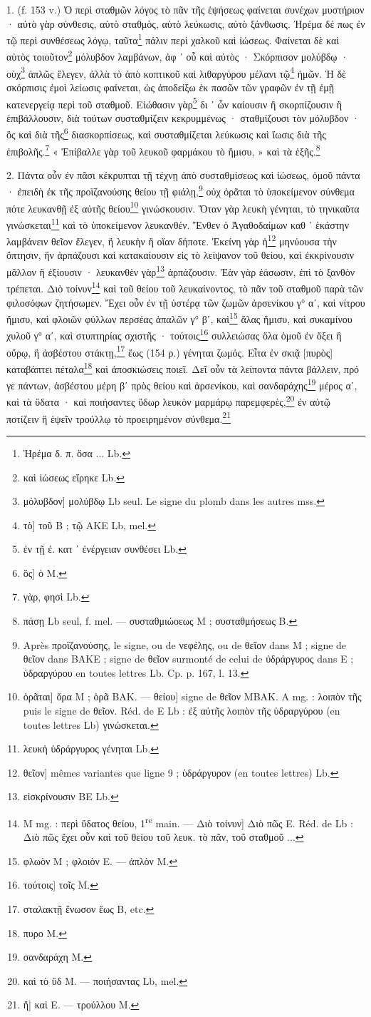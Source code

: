 \documentclass[a4paper, 11pt, oneside, polutonikogreek, french]{article}
\begin{document}
1. (f. 153 v.) Ὁ περὶ σταθμῶν λόγος τὸ πᾶν τῆς ἑψήσεως φαίνεται συνέχων μυστήριον · αὐτὸ γὰρ σύνθεσις, αὐτὸ σταθμὸς, αὐτὸ λεύκωσις, αὐτὸ ξάνθωσις. Ἠρέμα δέ πως ἐν τῷ περὶ συνθέσεως λόγῳ, ταῦτα\footnote{Ἠρέμα δ. π. ὅσα ... Lb.} πάλιν περὶ χαλκοῦ καὶ ἰώσεως. Φαίνεται δὲ καὶ αὐτὸς τοιοῦτον\footnote{καὶ ἰώσεως εἴρηκε Lb.} μόλυβδον λαμβάνων, ἀφ ᾽ οὗ καὶ αὐτὸς · Σκόρπισον μολύβδῳ · οὐχ\footnote{μόλυβδον] μολύβδῳ Lb seul. Le signe du plomb dans les autres mss.} ἁπλῶς ἔλεγεν, ἀλλὰ τὸ ἀπὸ κοπτικοῦ καὶ λιθαργύρου μέλανι τῷ\footnote{τὸ] τοῦ B ; τῷ AKE Lb, mel.} ἡμῶν. Ἡ δὲ σκόρπισις ἐμοὶ λείωσις φαίνεται, ὡς ἀποδείξω ἐκ πασῶν τῶν γραφῶν ἐν τῇ ἐμῇ κατενεργείᾳ περὶ τοῦ σταθμοῦ. Εἰώθασιν γὰρ\footnote{ἐν τῇ ἐ. κατ ᾽ ἐνέργειαν συνθέσει Lb.} δι ᾽ ὧν καίουσιν ἢ σκορπίζουσιν ἢ ἐπιβάλλουσιν, διὰ τούτων συσταθμίζειν κεκρυμμένως · σταθμίζουσι τὸν μόλυβδον · ὃς καὶ διὰ τῆς\footnote{ὃς] ὁ M.} διασκορπίσεως, καὶ συσταθμίζεται λεύκωσις καὶ ἴωσις διὰ τῆς ἐπιβολῆς.\footnote{γὰρ, φησὶ Lb.} « Ἐπίβαλλε γὰρ τοῦ λευκοῦ φαρμάκου τὸ ἥμισυ, » καὶ τὰ ἑξῆς.\footnote{πάσῃ Lb seul, f. mel. --- συσταθμιώοεως M ; συσταθμήσεως B.}

2. Πάντα οὖν ἐν πᾶσι κέκρυπται τῇ τέχνῃ ἀπὸ συσταθμίσεως καὶ ἰώσεως, ὁμοῦ πάντα · ἐπειδὴ ἐκ τῆς προϊζανούσης θείου τῇ φιάλῃ,\footnote{Après προϊζανούσης, le signe, ou de νεφέλης, ou de θεῖον dans M ; signe de θεῖον dans BAKE ; signe de θεῖον surmonté de celui de ὑδράργυρος dans E ; ὑδραργύρου en toutes lettres Lb. Cp. p. 167, l. 13.} οὐχ ὁρᾶται τὸ ὑποκείμενον σύνθεμα πότε λευκανθῇ ἐξ αὐτῆς θείου\footnote{ὁρᾶται] ὅρα M ; ὁρᾶ BAK. --- θείου] signe de θεῖον MBAK. A mg. : λοιπὸν τῆς puis le signe de θεῖον. Réd. de E Lb : ἐξ αὐτῆς λοιπὸν τῆς ὑδραργύρου (en toutes lettres Lb) γινώσκεται.} γινώσκουσιν. Ὅταν γὰρ λευκὴ γένηται, τὸ τηνικαῦτα γινώσκεται\footnote{λευκὴ ὑδράργυρος γένηται Lb.} καὶ τὸ ὑποκείμενον λευκανθέν. Ἔνθεν ὁ Ἀγαθοδαίμων καθ ᾽ ἑκάστην λαμβάνειν θεῖον ἔλεγεν, ἢ λευκὴν ἢ οἵαν δήποτε. Ἐκείνη γὰρ ἡ\footnote{θεῖον] mêmes variantes que ligne 9 ; ὑδράργυρον (en toutes lettres) Lb.} μηνύουσα τὴν ὄπτησιν, ἣν ἁρπάζουσι καὶ κατακαίουσιν εἰς τὸ λείψανον τοῦ θείου, καὶ ἐκκρίνουσιν μᾶλλον ἢ ἐξίουσιν · λευκανθὲν γὰρ\footnote{εἰσκρίνουσιν BE Lb.} ἁρπάζουσιν. Ἐὰν γὰρ ἐάσωσιν, ἐπὶ τὸ ξανθὸν τρέπεται. Διὸ τοίνυν\footnote{M mg. : περὶ ὕδατος θείου, 1\textsuperscript{re} main. --- Διὸ τοίνυν] Διὸ πῶς E. Réd. de Lb : Διὸ πῶς ἔχει οὖν καὶ τοῦ θείου τοῦ λευκ. τὸ πᾶν, τοῦ σταθμοῦ ...} καὶ τοῦ θείου τοῦ λευκαίνοντος, τὸ πᾶν τοῦ σταθμοῦ παρὰ τῶν φιλοσόφων ζητήσωμεν. Ἔχει οὖν ἐν τῇ ὑστέρᾳ τῶν ζωμῶν ἀρσενίκου γ° αʹ, καὶ νίτρου ἥμισυ, καὶ φλοιῶν φύλλων περσέας ἁπαλῶν γ° βʹ, καὶ\footnote{φλωὸν M ; φλοιὸν E. --- ἀπλὸν M.} ἅλας ἥμισυ, καὶ συκαμίνου χυλοῦ γ° αʹ, καὶ στυπτηρίας σχιστῆς · τούτοις\footnote{τούτοις] τοῖς M.} συλλειώσας ὅλα ὁμοῦ ἐν ὄξει ἢ οὔρῳ, ἢ ἀσβέστου στάκτῃ,\footnote{σταλακτῇ ἕνωσον ἕως B, etc.} ἕως (154 ρ.) γένηται ζωμός. Εἶτα ἐν σκιᾷ [πυρὸς] καταβάπτει πέταλα\footnote{πυρο M.} καὶ ἀποσκιώσεις ποιεῖ. Δεῖ οὖν τὰ λείποντα πάντα βάλλειν, πρό γε πάντων, ἀσβέστου μέρη βʹ πρὸς θείου καὶ ἀρσενίκου, καὶ σανδαράχης\footnote{σανδαράχη M.} μέρος αʹ, καὶ τὰ ὕδατα · καὶ ποιήσαντες ὕδωρ λευκὸν μαρμάρῳ παρεμφερὲς,\footnote{καὶ τὸ ὕδ M. --- ποιήσαντας Lb, mel.} ἐν αὐτῷ ποτίζειν ἢ ἑψεῖν τρούλλῳ τὸ προειρημένον σύνθεμα.\footnote{ἢ] καὶ E. --- τρούλλου M.}
\end{document}
